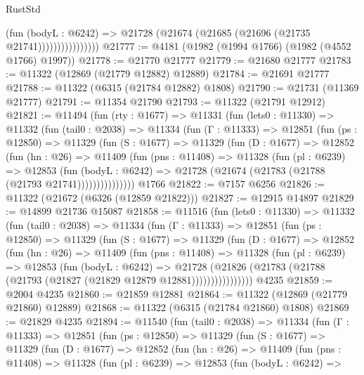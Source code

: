 \begin{lexlean}{RustStd}
\begin{coremodule}
                          (fun (bodyL : @6242) =>
                          @21728 (@21674 (@21685 (@21696 (@21735 @21741))))))))))))))))
@21777 := @4181 (@1982 (@1994 @1766) (@1982 (@4552 @1766) @1997))
@21778 := @21770 @21777
@21779 := @21680 @21777
@21783 := @11322 (@12869 (@21779 @12882) @12889)
@21784 := @21691 @21777
@21788 := @11322 (@6315 (@21784 @12882) @1808)
@21790 := @21731 (@11369 @21777)
@21791 := @11354 @21790
@21793 := @11322 (@21791 @12912)
@21821 := @11494
    (fun (rty : @1677) =>
    @11331
      (fun (lets0 : @11330) =>
      @11332
        (fun (tail0 : @2038) =>
        @11334
          (fun (Γ : @11333) =>
          @12851
            (fun (ps : @12850) =>
            @11329
              (fun (S : @1677) =>
              @11329
                (fun (D : @1677) =>
                @12852
                  (fun (hn : @26) =>
                  @11409
                    (fun (pns : @11408) =>
                    @11328
                      (fun (pl : @6239) =>
                      @12853
                        (fun (bodyL : @6242) =>
                        @21728 (@21674 (@21783 (@21788 (@21793 @21741)))))))))))))))
    @1766
@21822 := @7157 @6256
@21826 := @11322 (@21672 (@6326 (@12859 @21822)))
@21827 := @12915 @14897
@21829 := @14899 @21736 @15087
@21858 := @11516
    (fun (lets0 : @11330) =>
    @11332
      (fun (tail0 : @2038) =>
      @11334
        (fun (Γ : @11333) =>
        @12851
          (fun (ps : @12850) =>
          @11329
            (fun (S : @1677) =>
            @11329
              (fun (D : @1677) =>
              @12852
                (fun (hn : @26) =>
                @11409
                  (fun (pns : @11408) =>
                  @11328
                    (fun (pl : @6239) =>
                    @12853
                      (fun (bodyL : @6242) =>
                      @21728
                        (@21826
                          (@21783 (@21788 (@21793 (@21827 (@21829 @12879 @12881))))))))))))))))
    @4235
@21859 := @2004 @4235
@21860 := @21859 @12881
@21864 := @11322 (@12869 (@21779 @21860) @12889)
@21868 := @11322 (@6315 (@21784 @21860) @1808)
@21869 := @21829 @4235
@21894 := @11540
    (fun (tail0 : @2038) =>
    @11334
      (fun (Γ : @11333) =>
      @12851
        (fun (ps : @12850) =>
        @11329
          (fun (S : @1677) =>
          @11329
            (fun (D : @1677) =>
            @12852
              (fun (hn : @26) =>
              @11409
                (fun (pns : @11408) =>
                @11328
                  (fun (pl : @6239) =>
                  @12853
                    (fun (bodyL : @6242) =>

\end{coremodule}
\end{lexlean}
